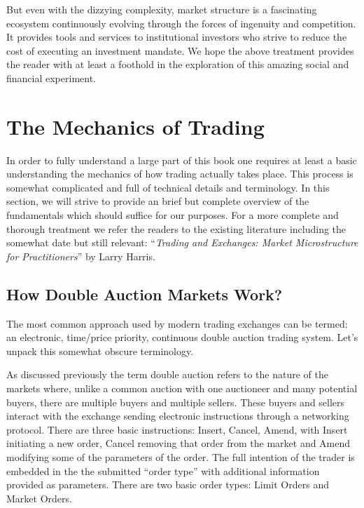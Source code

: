 But even with the dizzying complexity, market structure is a fascinating ecosystem continuously evolving through the forces of ingenuity and competition. It provides tools and services to institutional investors who strive to reduce the cost of executing an investment mandate. We hope the above treatment provides the reader with at least a foothold in the exploration of this amazing social and financial experiment.



\section{The Mechanics of Trading}

In order to fully understand a large part of this book one requires at least a basic understanding the mechanics of how trading actually takes place. This process is somewhat complicated and full of technical details and terminology. In this section, we will strive to provide an brief but complete overview of the fundamentals which should suffice for our purposes. For a more complete and thorough treatment we refer the readers to the existing literature including the somewhat date but still relevant: ``\emph{Trading and Exchanges: Market Microstructure for Practitioners}'' by Larry Harris.


\subsection{How Double Auction Markets Work?}


The most common approach used by modern trading exchanges can be termed: an electronic, time/price priority, continuous double auction trading system. Let's unpack this somewhat obscure terminology.


As discussed previously the term double auction refers to the nature of the markets where, unlike a common auction with one auctioneer and many potential buyers, there are multiple buyers and multiple sellers. These buyers and sellers interact with the exchange sending electronic instructions through a networking protocol. There are three basic instructions: Insert, Cancel, Amend, with Insert initiating a new order, Cancel removing that order from the market and Amend modifying some of the parameters of the order. The full intention of the trader is embedded in the the submitted ``order type'' with additional information provided as parameters. There are two basic order types: Limit Orders and Market Orders.


